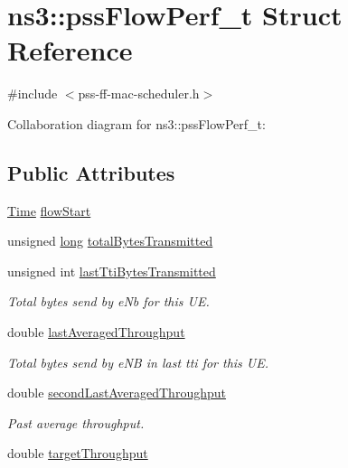 \hypertarget{structns3_1_1pssFlowPerf__t}{}\section{ns3\+:\+:pss\+Flow\+Perf\+\_\+t Struct Reference}
\label{structns3_1_1pssFlowPerf__t}


{\ttfamily \#include $<$pss-\/ff-\/mac-\/scheduler.\+h$>$}



Collaboration diagram for ns3\+:\+:pss\+Flow\+Perf\+\_\+t\+:
\subsection*{Public Attributes}
\begin{DoxyCompactItemize}
\item 
\hyperlink{classns3_1_1Time}{Time} \hyperlink{structns3_1_1pssFlowPerf__t_a6b7c218ad4d7f914539e95b02bd0e82f}{flow\+Start}
\item 
unsigned \hyperlink{generate__test__data__lte__sinr_8m_a0eab6be67e93c3411f7a8b53cc297285}{long} \hyperlink{structns3_1_1pssFlowPerf__t_adaf2b2fc1531f7785559a6b848628aa7}{total\+Bytes\+Transmitted}
\item 
unsigned int \hyperlink{structns3_1_1pssFlowPerf__t_ab4797a06f356f6d9b069a62de8534828}{last\+Tti\+Bytes\+Transmitted}
\begin{DoxyCompactList}\small\item\em Total bytes send by e\+Nb for this UE. \end{DoxyCompactList}\item 
double \hyperlink{structns3_1_1pssFlowPerf__t_a211e85f8ed4295134904ea6680fbd3aa}{last\+Averaged\+Throughput}
\begin{DoxyCompactList}\small\item\em Total bytes send by e\+NB in last tti for this UE. \end{DoxyCompactList}\item 
double \hyperlink{structns3_1_1pssFlowPerf__t_a068b7fbb57d8c595a95c8a44711ffbaf}{second\+Last\+Averaged\+Throughput}
\begin{DoxyCompactList}\small\item\em Past average throughput. \end{DoxyCompactList}\item 
double \hyperlink{structns3_1_1pssFlowPerf__t_a286efb21612af3262ba1a9305d1f4fc8}{target\+Throughput}
\end{DoxyCompactItemize}


